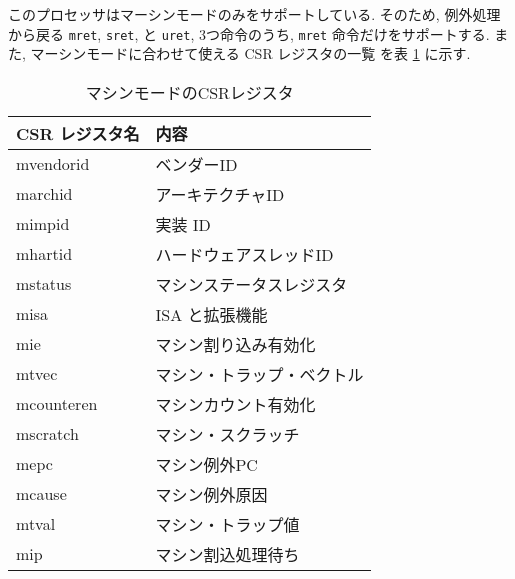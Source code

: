 \documentclass[../specifications.tex]{subfiles}
\begin{document}
  このプロセッサはマーシンモードのみをサポートしている.
  そのため, 例外処理から戻る \verb|mret|, \verb|sret|, と \verb|uret|, 
  3つ命令のうち, \verb|mret| 命令だけをサポートする.
  また, マーシンモードに合わせて使える CSR レジスタの一覧
  \cite{riscv-reader} \cite{riscv-priviledged}
  を表 \ref{table:csrs} に示す.

  \begin{table}[h]
    \begin{tabular}{|l|l|}
    \hline
    CSR レジスタ名 & 内容 \\ \hline
    mvendorid & ベンダーID \\
    marchid & アーキテクチャID \\
    mimpid & 実装 ID \\
    mhartid & ハードウェアスレッドID \\
    mstatus & マシンステータスレジスタ \\
    misa & ISA と拡張機能 \\
    mie & マシン割り込み有効化 \\
    mtvec & マシン・トラップ・ベクトル \\
    mcounteren & マシンカウント有効化 \\
    mscratch & マシン・スクラッチ \\
    mepc & マシン例外PC \\
    mcause & マシン例外原因 \\
    mtval & マシン・トラップ値 \\
    mip & マシン割込処理待ち \\ \hline
    \end{tabular}
    \caption{マシンモードのCSRレジスタ}
    \label{table:csrs}
  \end{table}
  
\end{document}
